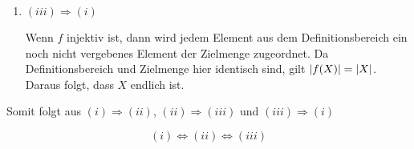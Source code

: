 \documentclass{article}
\begin{document}
\begin{enumerate}[(1)]
\item $(iii) \Rightarrow (i)$

  Wenn $f$ injektiv ist, dann wird jedem Element aus dem Definitionsbereich ein noch nicht vergebenes Element der Zielmenge
  zugeordnet.
  Da Definitionsbereich und Zielmenge hier identisch sind, gilt $\abs{f(X)} = \abs{X}$.
  Daraus folgt, dass $X$ endlich ist.
\end{enumerate}

Somit folgt aus $(i) \Rightarrow (ii)$, $(ii) \Rightarrow (iii)$ und $(iii) \Rightarrow (i)$

\[
  (i) \iff (ii) \iff (iii)
\]
\end{document}
